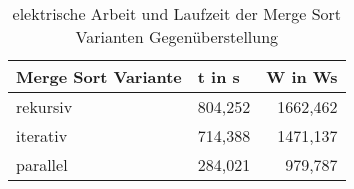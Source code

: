 \begin{table}[htbp]
  \centering
  \caption{elektrische Arbeit und Laufzeit der Merge Sort Varianten Gegen\"uberstellung}
    \begin{tabular}{lrr}
    \toprule
    Merge Sort Variante & \multicolumn{1}{l}{t in s} & \multicolumn{1}{l}{W in Ws} \\
    \midrule
    rekursiv & 804,252 & 1662,462 \\
    \midrule
    iterativ & 714,388 & 1471,137 \\
    \midrule
    parallel & 284,021 & 979,787 \\
    \bottomrule
    \end{tabular}%
  \label{tab:MergeSortLaufzeitArbeit}%
\end{table}%
